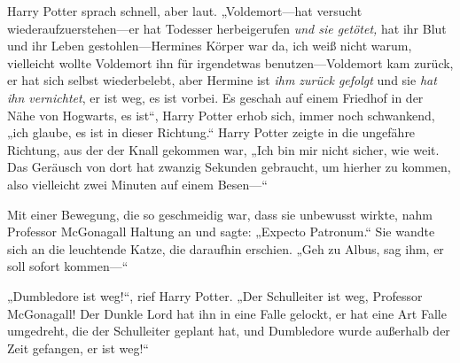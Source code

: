 Harry Potter sprach schnell, aber laut.
„Voldemort—hat versucht wiederaufzuerstehen—er hat Todesser herbeigerufen \emph{und sie getötet,} hat ihr Blut und ihr Leben gestohlen—Hermines Körper war da, ich weiß nicht warum, vielleicht wollte Voldemort ihn für irgendetwas benutzen—Voldemort kam zurück, er hat sich selbst wiederbelebt, aber Hermine ist \emph{ihm zurück gefolgt} und sie \emph{hat ihn vernichtet}, er ist weg, es ist vorbei.
Es geschah auf einem Friedhof in der Nähe von Hogwarts, es ist“, Harry Potter erhob sich, immer noch schwankend, „ich glaube, es ist in dieser Richtung.“
Harry Potter zeigte in die ungefähre Richtung, aus der der Knall gekommen war,
„Ich bin mir nicht sicher, wie weit. Das Geräusch von dort hat zwanzig Sekunden gebraucht, um hierher zu kommen, also vielleicht zwei Minuten auf einem Besen—“

Mit einer Bewegung, die so geschmeidig war, dass sie unbewusst wirkte, nahm Professor McGonagall Haltung an und sagte: „Expecto Patronum.“ Sie wandte sich an die leuchtende Katze, die daraufhin erschien.
„Geh zu Albus, sag ihm, er soll sofort kommen—“

„Dumbledore ist weg!“, rief Harry Potter. „Der Schulleiter ist weg, Professor McGonagall! Der Dunkle Lord hat ihn in eine Falle gelockt, er hat eine Art Falle umgedreht, die der Schulleiter geplant hat, und Dumbledore wurde außerhalb der Zeit gefangen, er ist weg!“

